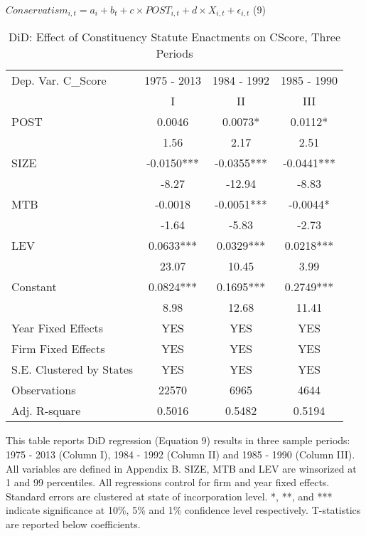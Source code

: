 \begin{table}[H]
	\centering
	\caption{DiD: Effect  of Constituency Statute Enactments on C\textunderscore Score, Three Periods}
	$Conservatism_{i,t}=a_i+b_t+c\times POST_{i,t}+d\times X_{i,t}+\epsilon_{i,t}$ \qquad (9)
	\begin{tabular}{lccc}
		\toprule
		\toprule
		Dep. Var. C\_Score & 1975 - 2013 & 1984 - 1992 & 1985 - 1990 \\
		& I & II & III \\
		\midrule
		\rowcolor[rgb]{ .906,  .902,  .902} POST  & 0.0046 & 0.0073* & 0.0112* \\
		\rowcolor[rgb]{ .906,  .902,  .902}       & 1.56  & 2.17  & 2.51 \\
		SIZE  & -0.0150*** & -0.0355*** & -0.0441*** \\
		& -8.27 & -12.94 & -8.83 \\
		MTB   & -0.0018 & -0.0051*** & -0.0044* \\
		& -1.64 & -5.83 & -2.73 \\
		LEV   & 0.0633*** & 0.0329*** & 0.0218*** \\
		& 23.07 & 10.45 & 3.99 \\
		Constant & 0.0824*** & 0.1695*** & 0.2749*** \\
		& 8.98  & 12.68 & 11.41 \\
		Year Fixed Effects & YES   & YES   & YES \\
		Firm Fixed Effects & YES   & YES   & YES \\
		S.E. Clustered by States & YES   & YES   & YES \\
		Observations  & 22570 & 6965  & 4644 \\
		Adj. R-square & 0.5016 & 0.5482 & 0.5194 \\
		\bottomrule
		\bottomrule
	\end{tabular}%
\end{table}%

\noindent This table reports DiD regression (Equation 9) results in three sample periods: 1975 - 2013 (Column I), 1984 - 1992 (Column II) and 1985 - 1990 (Column III). All variables are defined in Appendix B. SIZE, MTB and LEV are winsorized at 1 and 99 percentiles. All regressions control for firm and year fixed effects. Standard errors are clustered at state of incorporation level. *, **, and *** indicate significance at 10\%, 5\% and 1\% confidence level respectively. T-statistics are reported below coefficients.


